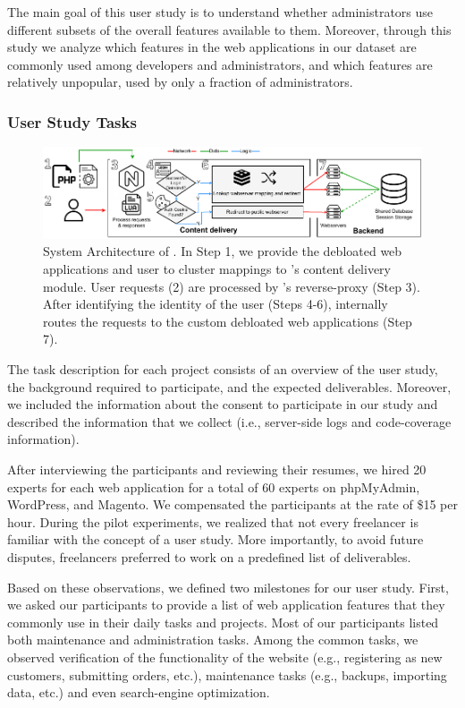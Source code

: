 The main goal of this user study is to understand whether administrators use different subsets of the overall features available to them. 
Moreover, through this study we analyze which features in the web applications in our dataset are commonly used among developers and administrators, and which features are relatively unpopular, used by only a fraction of administrators.

\subsubsection{User Study Tasks}

\begin{figure}[h]
    \centering
    \includegraphics[width=0.95\columnwidth]{figures/dbltr/RoleModelsFlow.pdf}
    \caption{System Architecture of \dbltr{}. In Step 1, we provide the debloated web applications and user to cluster mappings to \dbltr{}'s content delivery module. User requests (2) are processed by \dbltr{}'s reverse-proxy (Step 3). After identifying the identity of the user (Steps 4-6), \dbltr{} internally routes the requests to the custom debloated web applications (Step 7).}
	\label{fig:system_architecture}
\end{figure}

The task description for each project consists of an overview of the user study, the background required to participate, and the expected deliverables. 
Moreover, we included the information about the consent to participate in our study and described the information that we collect (i.e., server-side logs and code-coverage information). 

After interviewing the participants and reviewing their resumes, we hired 20 experts for each web application for a total of 60 experts on phpMyAdmin, WordPress, and Magento. 
We compensated the participants at the rate of \$15 per hour.
During the pilot experiments, we realized that not every freelancer is familiar with the concept of a user study. 
More importantly, to avoid future disputes, freelancers preferred to work on a predefined list of deliverables. 

Based on these observations, we defined two milestones for our user study. 
First, we asked our participants to provide a list of web application features that they commonly use in their daily tasks and projects. 
Most of our participants listed both maintenance and administration tasks. 
Among the common tasks, we observed verification of the functionality of the website (e.g., registering as new customers, submitting orders, etc.), maintenance tasks (e.g., backups, importing data, etc.) and even search-engine optimization. 

